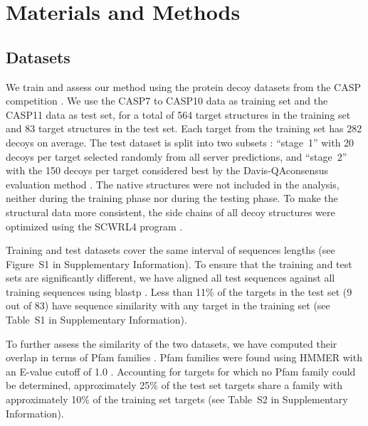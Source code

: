 \documentclass{bioinfo}
\begin{document}
\section{Materials and Methods}

\subsection{Datasets}

We train and assess our method using the protein decoy datasets from
the CASP competition \citep{moult2014critical}.  We use the CASP7 to
CASP10 data as training set and the CASP11 data as test set, for a
total of 564 target structures in the training set and 83 target
structures in the test set. Each target from the training set has 282
decoys on average.
The test dataset is split into two subsets \citep{kryshtafovych2015}:
``stage~1'' with 20 decoys per target selected randomly from all
server predictions, and ``stage~2'' with the 150 decoys per target
considered best by the Davis-QAconsensus evaluation
method \citep{kryshtafovych2015}.
The native structures were not included in the analysis, neither
during the training phase nor during the testing phase. To make the
structural data more consistent, the side chains of all decoy
structures were optimized using the SCWRL4 program
\citep{krivov2009improved}.

Training and test datasets cover the same interval of sequences
lengths (see Figure~S1 in Supplementary Information). To ensure that the
training and test sets are significantly different, we have aligned
all test sequences against all training sequences using
blastp \citep{altschul1990basic}.  Less than 11\% of the targets in the
test set (9 out of 83) have sequence similarity with any target in the
training set (see Table~S1 in Supplementary Information).

To further assess the similarity of the two datasets, we have computed
their overlap in terms of Pfam families \citep{finn2016pfam}. Pfam
families were found using HMMER \citep{finn2015hmmer} with an E-value
cutoff of 1.0 \citep{finn2016pfam}.  Accounting for targets for which
no Pfam family could be determined, approximately 25\% of the test set
targets share a family with approximately 10\% of the training set
targets (see Table~S2 in Supplementary Information).
\end{document}
